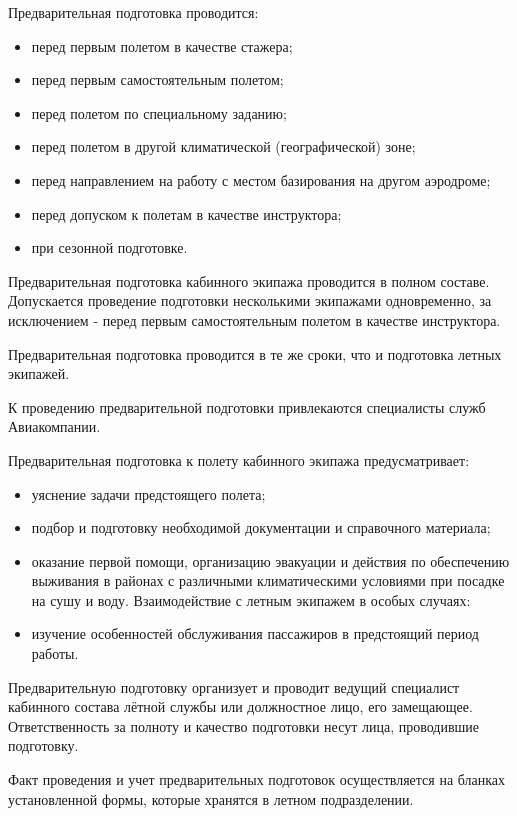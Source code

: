 Предварительная подготовка проводится:
\begin{itemize}
    \item перед первым полетом в качестве стажера;
    \item перед первым самостоятельным полетом;
    \item перед полетом по специальному заданию;
    \item перед полетом в другой климатической (географической) зоне;
    \item перед направлением на работу с местом базирования на другом аэродроме;
    \item перед допуском к полетам в качестве инструктора;
    \item при сезонной подготовке. 
\end{itemize}

Предварительная подготовка кабинного экипажа проводится в полном составе. Допускается проведение подготовки несколькими экипажами одновременно, за исключением - перед первым самостоятельным полетом в качестве инструктора.

Предварительная подготовка проводится в те же сроки, что и подготовка летных экипажей.

К проведению предварительной подготовки привлекаются специалисты служб Авиакомпании.

Предварительная подготовка к полету кабинного экипажа предусматривает:
\begin{itemize}
    \item уяснение задачи предстоящего полета;
    \item подбор и подготовку необходимой документации и справочного материала;
    \item оказание первой помощи, организацию эвакуации и действия по обеспечению выживания в районах с различными климатическими условиями при посадке на сушу и воду. Взаимодействие с летным экипажем в особых случаях:
    \item изучение особенностей обслуживания пассажиров в предстоящий период работы.
\end{itemize}

Предварительную подготовку организует и проводит ведущий специалист кабинного состава лётной службы или должностное лицо, его замещающее. Ответственность за полноту и качество подготовки несут лица, проводившие подготовку.

Факт проведения и учет предварительных подготовок осуществляется на бланках установленной формы, которые хранятся в летном подразделении.

